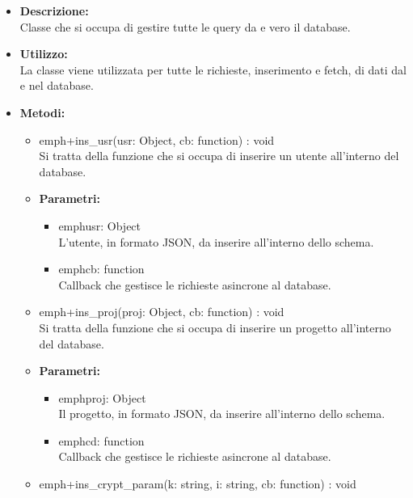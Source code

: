         \begin{itemize}
          \item \textbf{Descrizione: }\\
          Classe che si occupa di gestire tutte le query da e vero il database.
          \item \textbf{Utilizzo: }\\
          La classe viene utilizzata per tutte le richieste, inserimento e fetch, di dati dal e nel database.
          \item \textbf{Metodi: }\\
          \begin{itemize}
            \item emph{+ins_usr(usr: Object, cb: function) : void}\\
            Si tratta della funzione che si occupa di inserire un utente all'interno del database.
            \item \textbf{Parametri: }\\
            \begin{itemize}
              \item emph{usr: Object}\\
              L'utente, in formato JSON, da inserire all'interno dello schema.
              \item emph{cb: function}\\
              Callback che gestisce le richieste asincrone al database.
            \end{itemize}
            \item emph{+ins_proj(proj: Object, cb: function) : void}\\
            Si tratta della funzione che si occupa di inserire un progetto all'interno del database.
            \item \textbf{Parametri: }\\
            \begin{itemize}
              \item emph{proj: Object}\\
              Il progetto, in formato JSON, da inserire all'interno dello schema.
              \item emph{cd: function}\\
              Callback che gestisce le richieste asincrone al database.
            \end{itemize}
            \item emph{+ins_crypt_param(k: string, i: string, cb: function) : void}\\

\end{itemize}
\end{itemize}
